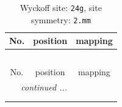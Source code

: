 \documentclass[fleqn,8pt]{jsarticle}
\begin{document}
\renewcommand{\arraystretch}{1.2}
\begin{longtable}{ccc}
\caption{Wyckoff site: {\tt 24g}, site symmetry: {\tt 2.mm}}
 \\
 \hline \hline
No. & position & mapping \\ \hline \endfirsthead

\multicolumn{2}{l}{\tablename\ \thetable{}} \\
 \hline \hline
No. & position & mapping \\ \hline \endhead

 \hline \hline
\multicolumn{2}{r}{\footnotesize\it continued ...} \\ \endfoot

 \hline \hline
\multicolumn{2}{r}{} \\ \endlastfoot


\end{longtable}
\end{document}
